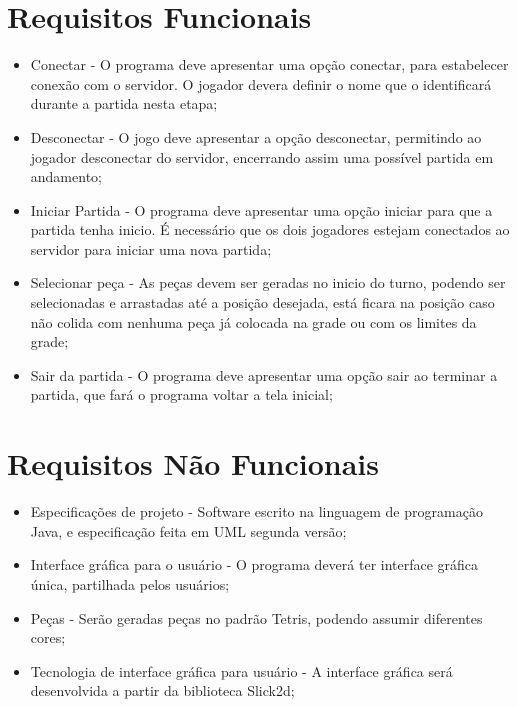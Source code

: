 \documentclass[
	12pt,	
	openany,			
	oneside,			
	a4paper,			
	english,			
	french,			
	spanish,			
	brazil,	
	]{abntex2}
\begin{document}
\section{Requisitos Funcionais}
\begin{itemize}
\item Conectar - O programa deve apresentar uma opção conectar, para estabelecer conexão com o servidor. O jogador devera definir o nome que o identificará durante a partida nesta etapa;
\item Desconectar - O jogo deve apresentar a opção desconectar, permitindo ao jogador desconectar do servidor, encerrando assim uma possível partida em andamento;
\item Iniciar Partida - O programa deve apresentar uma opção iniciar para que a partida tenha inicio. É necessário que os dois jogadores estejam conectados ao servidor para iniciar uma nova partida;
\item Selecionar peça - As peças devem ser geradas no inicio do turno, podendo ser selecionadas e arrastadas até a posição desejada, está ficara na posição caso não colida com nenhuma peça já colocada na grade ou com os limites da grade;
\item Sair da partida - O programa deve apresentar uma opção sair ao terminar a partida, que fará o programa voltar a tela inicial;
\end{itemize}

\section{Requisitos Não Funcionais}
\begin{itemize}
\item Especificações de projeto - Software escrito na linguagem de programação Java, e especificação feita em UML segunda versão;
\item Interface gráfica para o usuário - O programa deverá ter interface gráfica única, partilhada pelos usuários;
\item Peças - Serão geradas peças no padrão Tetris, podendo assumir diferentes cores;
\item Tecnologia de interface gráfica para usuário - A interface gráfica será desenvolvida a partir da biblioteca Slick2d;
\end{itemize}
\end{document}
